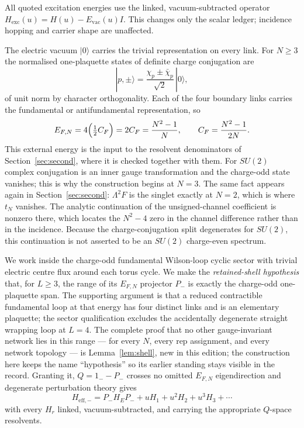 \documentclass[11pt]{article}
\theoremstyle{plain}
\theoremstyle{definition}
\theoremstyle{remark}
\newcommand{\chk}[1]{}
\newcommand{\CF}{C_F}
\begin{document}
All quoted excitation energies use the linked, vacuum-subtracted operator
$H_{\mathrm{exc}}(u)=H(u)-E_{\mathrm{vac}}(u)I$. This changes only the scalar
ledger; incidence hopping and carrier shape are unaffected.

The electric vacuum $|0\rangle$ carries the trivial representation on every
link. For $N\ge3$ the normalised one-plaquette states of definite charge
conjugation are
\begin{equation}\label{eq:states}
  |p,\pm\rangle=\frac{\chi_p\pm\bar\chi_p}{\sqrt2}\,|0\rangle ,
\end{equation}
of unit norm by character orthogonality. Each of the four boundary links
carries the fundamental or antifundamental representation, so
\begin{equation}\label{eq:EF}
  E_{F,N}=4\Bigl(\tfrac12 \CF\Bigr)=2\CF=\frac{N^2-1}{N},
  \qquad \CF=\frac{N^2-1}{2N}.
\end{equation}
This external energy is the input to the resolvent denominators of
Section~\ref{sec:second}, where it is checked together with them.
For $SU(2)$ complex conjugation is an inner gauge transformation and the
charge-odd state vanishes; this is why the construction begins at $N=3$. The
same fact appears again in Section~\ref{sec:second}: $\Lambda^2F$ is the
singlet exactly at $N=2$, which is where $t_N$ vanishes. The analytic
continuation of the unsigned-channel coefficient is nonzero there, which
locates the $N^2-4$ zero in the channel difference rather than in the
incidence. Because the charge-conjugation split degenerates for $SU(2)$, this
continuation is not asserted to be an $SU(2)$ charge-even spectrum.
\chk{at N = 2 the C-odd hopping vanishes and the C-even one does not}

We work inside the charge-odd fundamental Wilson-loop cyclic sector with
trivial electric centre flux around each torus cycle. We make the
\emph{retained-shell hypothesis} that, for $L\ge3$, the range of its
$E_{F,N}$ projector $P_-$ is exactly the charge-odd one-plaquette span. The
supporting argument is that a reduced contractible fundamental loop at that
energy has four distinct links and is an elementary plaquette; the sector
qualification excludes the accidentally degenerate straight wrapping loop at
$L=4$. The complete proof that no other gauge-invariant network lies in this
range --- for every $N$, every rep assignment, and every network topology ---
is Lemma~\ref{lem:shell}, new in this edition; the construction here keeps
the name ``hypothesis'' so its earlier standing stays visible in the record.
Granting it, $Q=1_--P_-$ crosses no
omitted $E_{F,N}$ eigendirection and degenerate perturbation theory gives
\begin{equation}\label{eq:heff}
  H_{\mathrm{eff},-}=P_-H_EP_-+uH_1+u^2H_2+u^3H_3+\cdots
\end{equation}
with every $H_r$ linked, vacuum-subtracted, and carrying the appropriate
$Q$-space resolvents.
\end{document}
